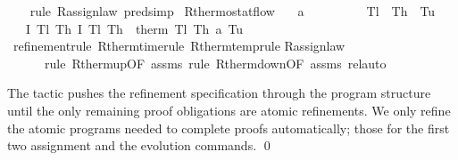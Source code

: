 \documentclass[envcountsame,envcountsect]{llncs}
\begin{document}
\begin{example}
\begin{isabellebody}
\ \ \isamarkupfalse%
\ {\isacharparenleft}rule\ R{\isacharunderscore}assign{\isacharunderscore}law{\isacharcomma}\ pred{\isacharunderscore}simp{\isacharparenright}%
\isanewline
\isanewline
{}\isamarkupfalse%
\ R{\isacharunderscore}thermostat{\isacharunderscore}flow{\isacharcolon}\isanewline
\ \ \ {\isachardoublequoteopen}a\ {\isachargreater}\ {}{\isachardoublequoteclose}\ \ {\isachardoublequoteopen}{}\ {\isasymle}\ {\isasymtau}{\isachardoublequoteclose}\ \ {\isachardoublequoteopen}{}\ {\isacharless}\ T\isactrlsub l{\isachardoublequoteclose}\ \ {\isachardoublequoteopen}T\isactrlsub h\ {\isacharless}\ T\isactrlsub u{\isachardoublequoteclose}\isanewline
\ \ \ {\isachardoublequoteopen}\isactrlbold {\isacharbrackleft}I\ T\isactrlsub l\ T\isactrlsub h{\isacharcomma}\ I\ T\isactrlsub l\ T\isactrlsub h\isactrlbold {\isacharbrackright}\ {\isasymge}\ therm\ T\isactrlsub l\ T\isactrlsub h\ a\ T\isactrlsub u\ {\isasymtau}{\isachardoublequoteclose}\isanewline
\ \ \isamarkupfalse%
\ {\isacharparenleft}refinement{\isacharsemicolon}{\isacharparenleft}rule\ R{\isacharunderscore}therm{\isacharunderscore}time{\isacharparenright}{\isacharquery}{\isacharcomma}{\isacharparenleft}rule\ R{\isacharunderscore}therm{\isacharunderscore}temp{\isacharparenright}{\isacharquery}{\isacharcomma}{\isacharparenleft}rule R{\isacharunderscore}assign{\isacharunderscore}law{\isacharparenright}{\isacharquery}{\isacharcomma} \isanewline
\ \ \ \ \ \ {\isacharparenleft}rule\ R{\isacharunderscore}therm{\isacharunderscore}up{\isacharbrackleft}OF\ assms{\isacharbrackright}{\isacharparenright}{\isacharquery}{\isacharcomma}\ {\isacharparenleft}rule\ R{\isacharunderscore}therm{\isacharunderscore}down{\isacharbrackleft}OF\ assms{\isacharbrackright}{\isacharparenright}{\isacharquery}{\isacharparenright}\ rel{\isacharunderscore}auto{\isacharprime}
\isanewline
\end{isabellebody}

The  tactic pushes the refinement specification
through the program structure until the only remaining proof
obligations are atomic refinements. We only refine the atomic programs
needed to complete proofs automatically; 
those for the first two assignment and the evolution commands. \qed
\end{example}
\end{document}
